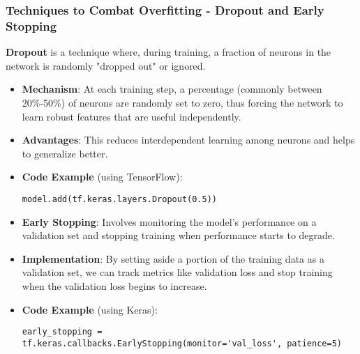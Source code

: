 \documentclass[aspectratio=169]{beamer}
\begin{document}
\begin{frame}[fragile]
    \frametitle{Techniques to Combat Overfitting - Dropout and Early Stopping}
    \textbf{Dropout} is a technique where, during training, a fraction of neurons in the network is randomly "dropped out" or ignored.
    
    \begin{itemize}
        \item \textbf{Mechanism}: At each training step, a percentage (commonly between 20\%-50\%) of neurons are randomly set to zero, thus forcing the network to learn robust features that are useful independently.
        
        \item \textbf{Advantages}: This reduces interdependent learning among neurons and helps to generalize better.

        \item \textbf{Code Example} (using TensorFlow):
        \begin{lstlisting}
model.add(tf.keras.layers.Dropout(0.5))
        \end{lstlisting}

        \item \textbf{Early Stopping}: Involves monitoring the model's performance on a validation set and stopping training when performance starts to degrade.
        
        \item \textbf{Implementation}: By setting aside a portion of the training data as a validation set, we can track metrics like validation loss and stop training when the validation loss begins to increase.

        \item \textbf{Code Example} (using Keras):
        \begin{lstlisting}
early_stopping = tf.keras.callbacks.EarlyStopping(monitor='val_loss', patience=5)
        \end{lstlisting}
    \end{itemize}
\end{frame}
\end{document}
